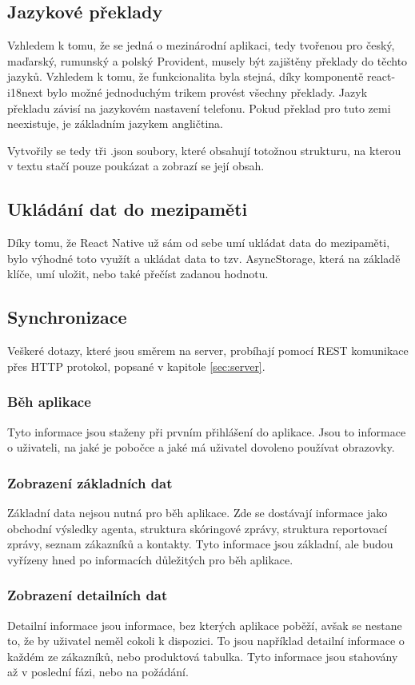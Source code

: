 \documentclass[11pt,twoside,a4paper]{book}
\begin{document}
\subsection{Jazykové překlady}
Vzhledem k tomu, že se jedná o mezinárodní aplikaci, tedy tvořenou pro český, maďarský, rumunský a polský Provident, musely být zajištěny překlady do těchto jazyků. Vzhledem k tomu, že funkcionalita byla stejná, díky komponentě react-i18next bylo možné jednoduchým trikem provést všechny překlady. Jazyk překladu závisí na jazykovém nastavení telefonu. Pokud překlad pro tuto zemi neexistuje, je základním jazykem angličtina.

Vytvořily se tedy tři .json soubory, které obsahují totožnou strukturu, na kterou v textu stačí pouze poukázat a zobrazí se její obsah. 

\subsection{Ukládání dat do mezipaměti}
Díky tomu, že React Native už sám od sebe umí ukládat data do mezipaměti, bylo výhodné toto využít a ukládat data to tzv. AsyncStorage, která na základě klíče, umí uložit, nebo také přečíst zadanou hodnotu. \cite{asyncstorage}

\subsection{Synchronizace}
Veškeré dotazy, které jsou směrem na server, probíhají pomocí REST komunikace přes HTTP protokol, popsané v kapitole \ref{sec:server}.

\subsubsection{Běh aplikace}
Tyto informace jsou staženy při prvním přihlášení do aplikace. Jsou to informace o uživateli, na jaké je pobočce a jaké má uživatel dovoleno používat obrazovky.

\subsubsection{Zobrazení základních dat}
Základní data nejsou nutná pro běh aplikace. Zde se dostávají informace jako obchodní výsledky agenta, struktura skóringové zprávy, struktura reportovací zprávy, seznam zákazníků a kontakty. Tyto informace jsou základní, ale budou vyřízeny hned po informacích důležitých pro běh aplikace.

\subsubsection{Zobrazení detailních dat}
Detailní informace jsou informace, bez kterých aplikace poběží, avšak se nestane to, že by uživatel neměl cokoli k dispozici. To jsou například detailní informace o každém ze zákazníků, nebo produktová tabulka. Tyto informace jsou stahovány až v poslední fázi, nebo na požádání.  
\end{document}
